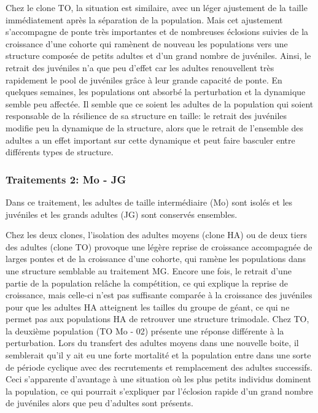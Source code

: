 Chez le clone TO, la situation est similaire, avec un léger ajustement de la
taille immédiatement après la séparation de la population. Mais cet ajustement
s'accompagne de ponte très importantes et de nombreuses éclosions suivies de
la croissance d'une cohorte qui ramènent de nouveau les populations vers une
structure composée de petits adultes et d'un grand nombre de juvéniles.
Ainsi, le retrait des juvéniles n'a que peu d'effet car les adultes renouvellent très rapidement le
pool de juvéniles grâce à leur grande capacité de ponte. En quelques semaines,
les populations ont absorbé la perturbation et la dynamique semble peu affectée.
Il semble que ce soient les adultes de la population qui soient
responsable de la résilience de sa structure en taille: le retrait des juvéniles
modifie peu la dynamique de la structure, alors que le retrait de l'ensemble des
adultes a un effet important sur cette dynamique et peut faire basculer entre
différents types de structure. 

\subsubsection{Traitements 2: Mo - JG}

Dans ce traitement, les adultes de taille intermédiaire (Mo) sont isolés et les
juvéniles et les grands adultes (JG) sont conservés ensembles.

Chez les deux clones, l'isolation des adultes moyens (clone HA) ou de deux tiers
des adultes (clone TO) provoque une légère reprise de croissance accompagnée de
larges pontes et de la croissance d'une cohorte, qui ramène les populations dans
une structure semblable au traitement MG. Encore une fois, le retrait d'une
partie de la population relâche la compétition, ce qui explique la reprise de croissance,
mais celle-ci n'est pas suffisante comparée à la croissance des juvéniles pour
que les adultes HA atteignent les tailles du groupe de géant, ce qui ne permet
pas aux populations HA de retrouver une structure trimodale. Chez TO, la
deuxième population (TO Mo - 02) présente une réponse différente à la
perturbation. Lors du transfert des adultes moyens dans une nouvelle boite, il
semblerait qu'il y ait eu une forte mortalité et la population entre dans une
sorte de période cyclique avec des recrutements et remplacement des adultes
successifs. Ceci s'apparente d'avantage à une situation où les plus petits
individus dominent la population, ce qui pourrait s'expliquer par l'éclosion
rapide d'un grand nombre de juvéniles alors que peu d'adultes sont présents. 

